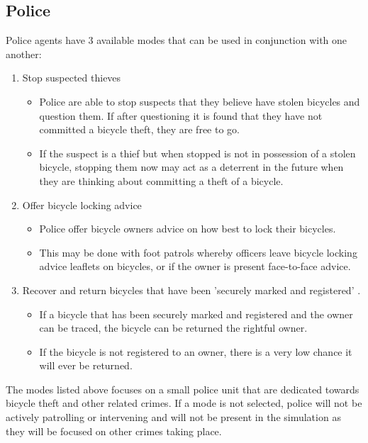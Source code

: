 \documentclass[11pt]{informatics-report}
\begin{document}
\subsection{Police}  
Police agents have 3 available modes that can be used in conjunction with one another:
\begin{enumerate}
	\item Stop suspected thieves
	\begin{itemize}
		\item Police are able to stop suspects that they believe have stolen bicycles and question them. If after questioning it is found that they have not committed a bicycle theft, they are free to go.
		\item If the suspect is a thief but when stopped is not in possession of a stolen bicycle, stopping them now may act as a deterrent in the future when they are thinking about committing a theft of a bicycle.
	\end{itemize}
	\item Offer bicycle locking advice
	\begin{itemize}
	\item Police offer bicycle owners advice on how best to lock their bicycles.
	\item This may be done with foot patrols whereby officers leave bicycle locking advice leaflets on bicycles, or if the owner is present face-to-face advice.
	\end{itemize}
	\item Recover and return bicycles that have been 'securely marked and registered' \cite{popoadvice} . 
	\begin{itemize}
		\item If a bicycle that has been securely marked and registered and the owner can be traced, the bicycle can be returned the rightful owner.
		\item If the bicycle is not registered to an owner, there is a very low chance it will ever be returned. 
	\end{itemize}
	\end{enumerate} \par
	
The modes listed above focuses on a small police unit that are dedicated towards bicycle theft and other related crimes. If a mode is not selected, police will not be actively patrolling or intervening and will not be present in the simulation as they will be focused on other crimes taking place. 
	
\end{document}
